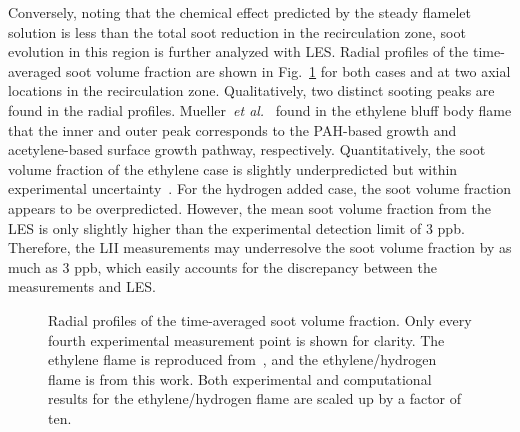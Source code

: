 \documentclass[review,3p,times]{elsarticle}
\begin{document}
Conversely, noting that the chemical effect predicted by the steady flamelet solution is less than the total soot reduction in the recirculation zone, soot evolution in this region is further analyzed with LES.  Radial profiles of the time-averaged soot volume fraction are shown in Fig.~\ref{fig:fv_radial} for both cases and at two axial locations in the recirculation zone.  Qualitatively, two distinct sooting peaks are found in the radial profiles.  Mueller~\emph{et al.}~\cite{mueller13} found in the ethylene bluff body flame that the inner and outer peak corresponds to the PAH-based growth and acetylene-based surface growth pathway, respectively.  Quantitatively, the soot volume fraction of the ethylene case is slightly underpredicted but within experimental uncertainty~\cite{mueller13}.  For the hydrogen added case, the soot volume fraction appears to be overpredicted.  However, the mean soot volume fraction from the LES is only slightly higher than the experimental detection limit of 3 ppb.  Therefore, the LII measurements may underresolve the soot volume fraction by as much as 3 ppb, which easily accounts for the discrepancy between the measurements and LES.


\begin{figure}[t]
  \centering
  \scriptsize
  \resizebox{0.49\textwidth}{!}{}
  \resizebox{0.49\textwidth}{!}{}
  \vspace{-0.3in}
  \normalsize
  \caption{Radial profiles of the time-averaged soot volume fraction.  Only every fourth experimental measurement point is shown for clarity.  The ethylene flame is reproduced from~\cite{mueller13}, and the ethylene/hydrogen flame is from this work.  Both experimental and computational results for the ethylene/hydrogen flame are scaled up by a factor of ten.}
  \label{fig:fv_radial}
\end{figure}
\end{document}

